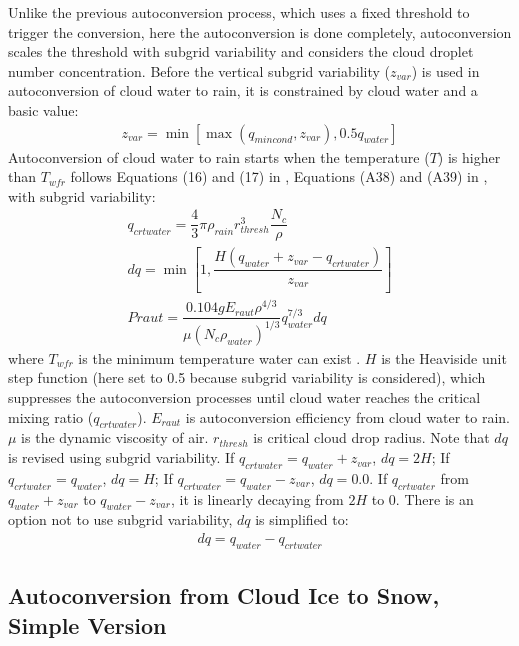 \documentclass[letterpaper,titlepage,10pt]{article}
\numberwithin{equation}{section}
\begin{document}
Unlike the previous autoconversion process, which uses a fixed threshold to trigger the conversion, here the autoconversion is done completely, autoconversion scales the threshold with subgrid variability and considers the cloud droplet number concentration. Before the vertical subgrid variability ($z_{var}$) is used in autoconversion of cloud water to rain, it is constrained by cloud water and a basic value:
\begin{gather}
	z_{var} = \min \left[ \max \left(q_{mincond}, z_{var} \right), 0.5 q_{water} \right]
\end{gather} 
Autoconversion of cloud water to rain starts when the temperature ($T$) is higher than $T_{wfr}$ follows Equations (16) and (17) in \citet{hong2004arev}, Equations (A38) and (A39) in \citet{hong2006thew}, with subgrid variability:
\begin{gather}
	q_{crtwater} = \dfrac{4}{3} \pi \rho_{rain} r_{thresh}^3 \dfrac{N_c}{\rho} \\
	dq = \min \left[1, \dfrac{H \left(q_{water} + z_{var} - q_{crtwater} \right)}{z_{var}} \right] \\
	Praut = \dfrac{0.104 g E_{raut} \rho^{4/3}}{\mu \left(N_c \rho_{water} \right)^{1/3}} q_{water}^{7/3} dq
\end{gather}
where $T_{wfr}$ is the minimum temperature water can exist \citep{moore2011stru}. $H$ is the Heaviside unit step function (here set to 0.5 because subgrid variability is considered), which suppresses the autoconversion processes until cloud water reaches the critical mixing ratio ($q_{crtwater}$). $E_{raut}$ is autoconversion efficiency from cloud water to rain. $\mu$ is the dynamic viscosity of air. $r_{thresh}$ is critical cloud drop radius. Note that $dq$ is revised using subgrid variability. If $q_{crtwater} = q_{water} + z_{var}$, $dq = 2H$; If $q_{crtwater} = q_{water}$, $dq = H$; If $q_{crtwater} = q_{water} - z_{var}$, $dq = 0.0$. If $q_{crtwater}$ from $q_{water} + z_{var}$ to $q_{water} - z_{var}$, it is linearly decaying from $2H$ to $0$. There is an option not to use subgrid variability, $dq$ is simplified to:
\begin{gather}
	dq = q_{water} - q_{crtwater}
\end{gather}


\subsection{Autoconversion from Cloud Ice to Snow, Simple Version}
\end{document}
